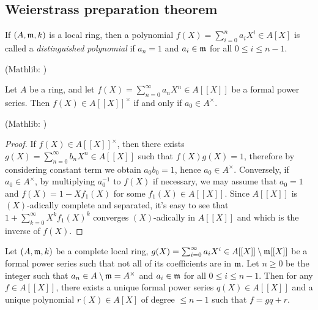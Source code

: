 \subsection{Weierstrass preparation theorem}

\begin{definition}
\label{distinguished-polynomial}
\leanok
If $(A,{\mathfrak{m}},k)$ is a local ring, then a polynomial $f(X)=\sum_{i=0}^na_iX^i\in A[X]$
is called a \emph{distinguished polynomial}
if $a_n=1$ and $a_i\in{\mathfrak{m}}$ for all $0\leq i\leq n-1$.

(Mathlib: )
\end{definition}

\begin{prop}
\label{power-series-invertible-iff}
\leanok
Let $A$ be a ring, and let $f(X)=\sum_{n=0}^\infty a_nX^n\in A[[X]]$
be a formal power series.
Then $f(X)\in A[[X]]^\times$ if and only if $a_0\in A^\times$.

(Mathlib: )
\end{prop}

\begin{proof}
\leanok
If $f(X)\in A[[X]]^\times$,
then there exists $g(X)=\sum_{n=0}^\infty b_nX^n\in A[[X]]$
such that $f(X)g(X)=1$, therefore by considering constant term we obtain
$a_0b_0=1$, hence $a_0\in A^\times$.
Conversely, if $a_0\in A^\times$, by multiplying $a_0^{-1}$ to $f(X)$
if necessary, we may assume that $a_0=1$
and $f(X)=1-Xf_1(X)$ for some $f_1(X)\in A[[X]]$.
Since $A[[X]]$ is $(X)$-adically complete and separated,
it's easy to see that $1+\sum_{k=0}^\infty X^kf_1(X)^k$
converges $(X)$-adically in $A[[X]]$ and which is the inverse of
$f(X)$.
\end{proof}

\begin{prop}
\label{weierstrass-division}
\leanok
Let $(A,{\mathfrak{m}},k)$ be a complete local ring,
$g(X)=\sum_{i=0}^\infty a_iX^i\in A[[X]]\setminus{\mathfrak{m}}[[X]]$ be a formal power series
such that not all of its coefficients are in ${\mathfrak{m}}$.
Let $n\geq 0$ be the integer such that $a_n\in A\setminus{\mathfrak{m}}=A^\times$
and $a_i\in{\mathfrak{m}}$ for all $0\leq i\leq n-1$.
Then for any $f\in A[[X]]$,
there exists a unique formal power series
$q(X)\in A[[X]]$ and a unique polynomial $r(X)\in A[X]$ of degree $\leq n-1$
such that $f=gq+r$.
\end{prop}

